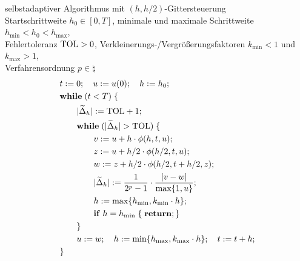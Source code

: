 \begin{Def}{selbstadaptiver Algorithmus mit $(h, h/2)$-Gittersteuerung}\\
    Startschrittweite $h_0 \in [0, T]$,\qquad
    minimale und maximale Schrittweite $h_{\min} < h_0 < h_{\max}$,\\
    Fehlertoleranz $\text{TOL} > 0$,\qquad
    Verkleinerungs-/Vergrößerungsfaktoren
    $k_{\min} < 1$ und $k_{\max} > 1$,\\
    Verfahrensordnung $p \in \natural$
    \begin{align*}&
        t := 0;\quad
        u := u(0);\quad
        h := h_0;\\&
        \mathbf{while}\; (t < T)\; \{\\&
        \qquad|\widetilde{\Delta}_h| := \text{TOL} + 1;\;\\&
        \qquad\mathbf{while}\; (|\widetilde{\Delta}_h| > \text{TOL})\; \{\\&
        \qquad\qquad v := u + h \cdot \phi(h, t, u);\\&
        \qquad\qquad z := u + h/2 \cdot \phi(h/2, t, u);\\&
        \qquad\qquad w := z + h/2 \cdot \phi(h/2, t + h/2, z);\\&
        \qquad\qquad |\widetilde{\Delta}_h| := \frac{1}{2^p - 1} \cdot
                     \frac{|v - w|}{\max\{1, u\}};\\&
        \qquad\qquad h := \max\{h_{\min}, k_{\min} \cdot h\};\\&
        \qquad\qquad\mathbf{if}\; h = h_{\min}\; \{\; \mathbf{return}; \}\\&
        \qquad\}\\&
        \qquad u := w;\quad
        h := \min\{h_{\max}, k_{\max} \cdot h\};\quad
        t := t + h;\\&
        \}
    \end{align*}
\end{Def}

\pagebreak

